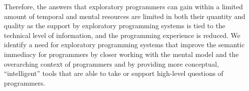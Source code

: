 Therefore, the answers that exploratory programmers can gain within a limited amount of temporal and mental resources are limited in both their quantity and quality as the support by exploratory programming systems is tied to the technical level of information, and the programming experience is reduced.
We identify a need for exploratory programming systems that improve the semantic immediacy for programmers by closer working with the mental model and the overarching context of programmers and by providing more conceptual, ``intelligent'' tools that are able to take or support high-level questions of programmers.
